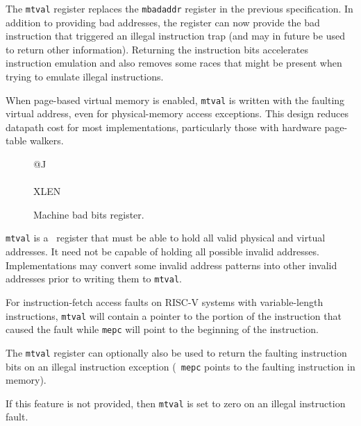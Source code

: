 \begin{commentary}
  The {\tt mtval} register replaces the {\tt mbadaddr} register in
  the previous specification.  In addition to providing bad addresses,
  the register can now provide the bad instruction that triggered an
  illegal instruction trap (and may in future be used to return other
  information).  Returning the instruction bits accelerates instruction emulation and also
  removes some races that might be present when trying to emulate
  illegal instructions.
\end{commentary}
\begin{commentary}
  When page-based virtual memory is enabled, {\tt mtval} is written with
  the faulting virtual address, even for physical-memory access exceptions.
  This design reduces datapath cost for most implementations, particularly
  those with hardware page-table walkers.
\end{commentary}

\begin{figure}[h!]
{\footnotesize
\begin{center}
\begin{tabular}{@{}J}
 \\
\hline
{} \\
\hline
XLEN \\
\end{tabular}
\end{center}
}
\vspace{-0.1in}
\caption{Machine bad bits register.}
\label{mtvalreg}
\end{figure}

{\tt mtval} is a \warl\ register that must be able to hold all valid physical
and virtual addresses.  It need not be capable of holding all possible invalid
addresses.  Implementations may convert some invalid address patterns into
other invalid addresses prior to writing them to {\tt mtval}.

For instruction-fetch access faults on RISC-V systems with
variable-length instructions, {\tt mtval} will contain a pointer to
the portion of the instruction that caused the fault while {\tt mepc}
will point to the beginning of the instruction.

The {\tt mtval} register can optionally also be used to return the
faulting instruction bits on an illegal instruction exception ({\tt
  mepc} points to the faulting instruction in memory).

If this feature is not provided, then {\tt mtval} is set to zero on
an illegal instruction fault.

